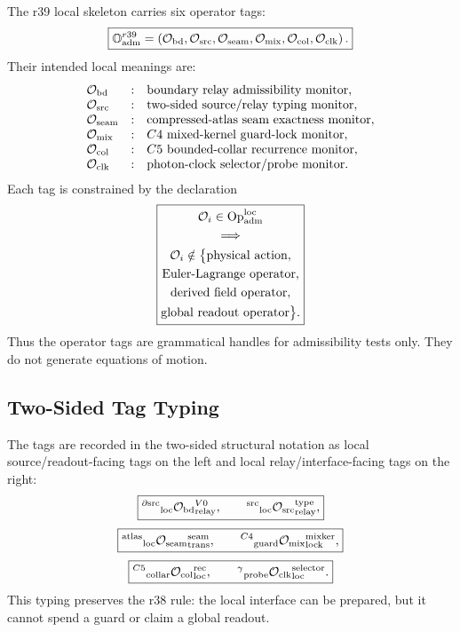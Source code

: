 The r39 local skeleton carries six operator tags:
\[
\boxed{
\mathbb O_{\rm adm}^{r39}
=
\left(
\mathcal O_{\rm bd},
\mathcal O_{\rm src},
\mathcal O_{\rm seam},
\mathcal O_{\rm mix},
\mathcal O_{\rm col},
\mathcal O_{\rm clk}
\right).
}
\]
Their intended local meanings are:
\[
\begin{array}{lll}
\mathcal O_{\rm bd}   &:& \hbox{boundary relay admissibility monitor},\\
\mathcal O_{\rm src}  &:& \hbox{two-sided source/relay typing monitor},\\
\mathcal O_{\rm seam} &:& \hbox{compressed-atlas seam exactness monitor},\\
\mathcal O_{\rm mix}  &:& C4\hbox{ mixed-kernel guard-lock monitor},\\
\mathcal O_{\rm col}  &:& C5\hbox{ bounded-collar recurrence monitor},\\
\mathcal O_{\rm clk}  &:& \hbox{photon-clock selector/probe monitor}.
\end{array}
\]
Each tag is constrained by the declaration
\[
\boxed{
\begin{gathered}
\mathcal O_i\in\mathrm{Op}_{\rm adm}^{\rm loc}
\\\Longrightarrow\\
\mathcal O_i\notin
\bigl\{
\mathrm{physical\ action},\\
\mathrm{Euler\mbox{-}Lagrange\ operator},\\
\mathrm{derived\ field\ operator},\\
\mathrm{global\ readout\ operator}
\bigr\}.
\end{gathered}
}
\]
Thus the operator tags are grammatical handles for admissibility tests only.
They do not generate equations of motion.

\subsection{Two-Sided Tag Typing}
\label{subsec:r39-two-sided-tag-typing}

The tags are recorded in the two-sided structural notation as local
source/readout-facing tags on the left and local relay/interface-facing tags on
the right:
\[
\boxed{
{}^{\partial{\rm src}}{}_{\rm loc}
\mathcal O_{\rm bd}
{}^{V0}_{\rm relay},
\qquad
{}^{{\rm src}}{}_{\rm loc}
\mathcal O_{\rm src}
{}^{{\rm type}}_{\rm relay},
}
\]
\[
\boxed{
{}^{{\rm atlas}}{}_{\rm loc}
\mathcal O_{\rm seam}
{}^{{\rm seam}}_{\rm trans},
\qquad
{}^{C4}{}_{\rm guard}
\mathcal O_{\rm mix}
{}^{{\rm mixker}}_{\rm lock},
}
\]
\[
\boxed{
{}^{C5}{}_{\rm collar}
\mathcal O_{\rm col}
{}^{{\rm rec}}_{\rm loc},
\qquad
{}^{\gamma}{}_{\rm probe}
\mathcal O_{\rm clk}
{}^{{\rm selector}}_{\rm loc}.
}
\]
This typing preserves the r38 rule: the local interface can be prepared, but it
cannot spend a guard or claim a global readout.

